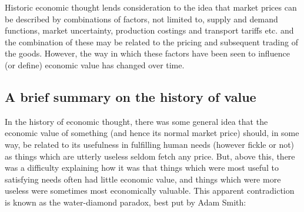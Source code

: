 Historic economic thought lends consideration to the idea that market prices can be described by combinations of factors, not limited to, supply and demand functions, market uncertainty, production costings and transport tariffs etc. and the combination of these may be related to the pricing and subsequent trading of the goods.
However, the way in which these factors have been seen to influence (or define) economic value has changed over time.

\subsection{A brief summary on the history of value}

In the history of economic thought, there was some general idea that the economic value of something (and hence its normal market price) should, in some way, be related to its usefulness in fulfilling human needs (however fickle or not) as things which are utterly useless seldom fetch any price.
But, above this, there was a difficulty explaining how it was that things which were most useful to satisfying needs often had little economic value, and things which were more useless were sometimes most economically valuable. This apparent contradiction is known as the water-diamond paradox, best put by Adam Smith:


